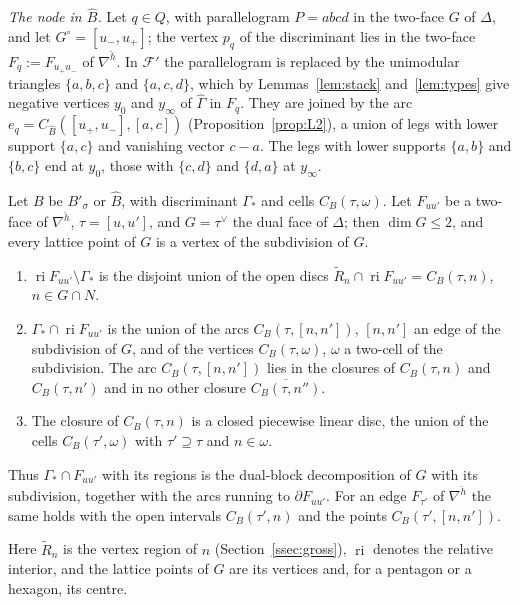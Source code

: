 \emph{The node in $\widehat B$.} Let $q\in Q$, with parallelogram $P=abcd$ in the two-face $G$ of $\Delta$, and let
$G^\circ=[u_-,u_+]$; the vertex $p_q$ of the discriminant lies in the two-face $F_q:=F_{u_+u_-}$ of $\nabla^{\check h}$. In $\mathcal F'$
the parallelogram is replaced by the unimodular triangles $\{a,b,c\}$ and $\{a,c,d\}$, which by Lemmas~\ref{lem:stack}
and~\ref{lem:types} give negative vertices $y_0$ and $y_\infty$ of $\widehat\Gamma$ in $F_q$. They are joined by the arc
$e_q=C_{\widehat B}([u_+,u_-],[a,c])$ (Proposition~\ref{prop:L2}), a union of legs with lower support $\{a,c\}$ and vanishing
vector $c-a$. The legs with lower supports $\{a,b\}$ and $\{b,c\}$ end at $y_0$, those with $\{c,d\}$ and $\{d,a\}$ at
$y_\infty$.

\begin{lemma}\label{lem:twofaces}
Let $B$ be $B'_\sigma$ or $\widehat B$, with discriminant $\Gamma_*$ and cells $C_B(\tau,\omega)$. Let $F_{uu'}$ be a
two-face of $\nabla^{\check h}$, $\tau=[u,u']$, and $G=\tau^\vee$ the dual face of $\Delta$; then $\dim G\le2$, and every
lattice point of $G$ is a vertex of the subdivision of $G$.
\begin{enumerate}
\item $\operatorname{ri}F_{uu'}\setminus\Gamma_*$ is the disjoint union of the open discs
$\widetilde R_n\cap\operatorname{ri}F_{uu'}=C_B(\tau,n)$, $n\in G\cap N$.
\item $\Gamma_*\cap\operatorname{ri}F_{uu'}$ is the union of the arcs $C_B(\tau,[n,n'])$, $[n,n']$ an edge of the subdivision
of $G$, and of the vertices $C_B(\tau,\omega)$, $\omega$ a two-cell of the subdivision. The arc $C_B(\tau,[n,n'])$ lies in the
closures of $C_B(\tau,n)$ and $C_B(\tau,n')$ and in no other closure $\overline{C_B(\tau,n'')}$.
\item The closure of $C_B(\tau,n)$ is a closed piecewise linear disc, the union of the cells $C_B(\tau',\omega)$ with
$\tau'\supseteq\tau$ and $n\in\omega$.
\end{enumerate}
Thus $\Gamma_*\cap F_{uu'}$ with its regions is the dual-block decomposition of $G$ with its subdivision, together with
the arcs running to $\partial F_{uu'}$. For an edge $F_{\tau'}$ of $\nabla^{\check h}$ the same holds with the open intervals
$C_B(\tau',n)$ and the points $C_B(\tau',[n,n'])$.
\end{lemma}
Here $\widetilde R_n$ is the vertex region of $n$ (Section~\ref{ssec:gross}), $\operatorname{ri}$ denotes the relative interior,
and the lattice points of $G$ are its vertices and, for a pentagon or a hexagon, its centre.
